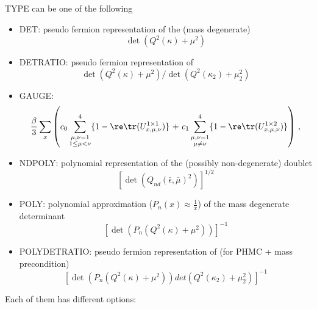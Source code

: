 {\ttfamily TYPE} can be one of the following
\begin{itemize}
\item {\ttfamily DET}: pseudo fermion representation of the (mass degenerate)\\
  \[
  \det(Q^2(\kappa) + \mu^2)
  \]
\item {\ttfamily DETRATIO}: pseudo fermion representation of\\
  \[
  \det(Q^2(\kappa) + \mu^2)/\det(Q^2(\kappa_2) + \mu_2^2)
  \]
\item {\ttfamily GAUGE}:\\
  \[
  \frac{\beta}{3}\sum_x\left(  c_0\sum_{\substack{
        \mu,\nu=1\\1\leq\mu<\nu}}^4\{1-\re\tr(U^{1\times1}_{x,\mu,\nu})\}\Bigr. 
    \Bigl.\ +\ 
    c_1\sum_{\substack{\mu,\nu=1\\\mu\neq\nu}}^4\{1
    -\re\tr(U^{1\times2}_{x,\mu,\nu})\}\right)\,  ,
  \]
\item {\ttfamily NDPOLY}: polynomial representation of the (possibly
  non-degenerate) doublet\\
  \[
  [\det(Q_{nd}(\bar\epsilon, \bar\mu)^2)]^{1/2}
  \]
\item {\ttfamily POLY}: polynomial approximation ($P_n(x) \approx \frac{1}{x}$) of the mass degenerate determinant\\
  \[
  \left[\det(P_{n}(Q^2(\kappa) + \mu^2))\right]^{-1}
  \]
\item {\ttfamily POLYDETRATIO}: pseudo fermion representation of (for PHMC + mass precondition)\\
  \[
  \left[\det(P_{n}(Q^2(\kappa) + \mu^2)) det(Q^2(\kappa_2) + \mu^2_2)\right]^{-1}
  \]
\end{itemize}
Each of them has different options:
